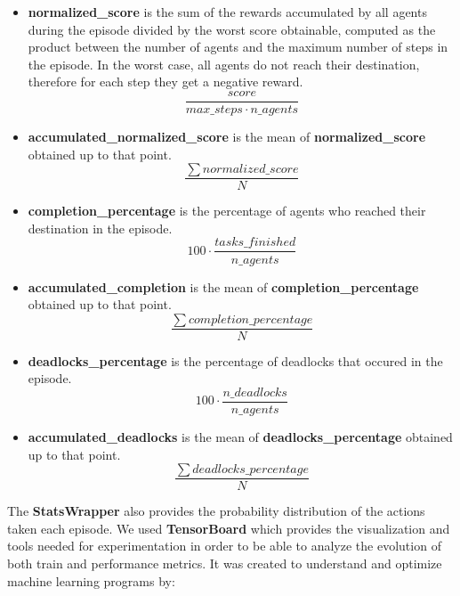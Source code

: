 \documentclass[11pt, a4paper, hidelinks]{report}
\begin{document}
\begin{itemize}
\item \textbf{normalized\_score} is the sum of the rewards accumulated by all agents during the episode divided by the worst score obtainable, computed as the product between the number of agents and the maximum number of steps in the episode.
In the worst case, all agents do not reach their destination, therefore for each step they get a negative reward.
\begin{equation}{\frac{score}{max\_steps \cdot n\_agents}}\label{eq:score}\end{equation}
\item \textbf{accumulated\_normalized\_score} is the mean of \textbf{normalized\_score} obtained up to that point.
\begin{equation}{\frac{\sum{normalized\_score}}{N}}\label{eq:score_acc}\end{equation}
\item \textbf{completion\_percentage} is the percentage of agents who reached their destination in the episode.
\begin{equation}{100 \cdot {\frac{tasks\_finished}{n\_agents}}}\label{eq:compl_perc}\end{equation}
\item \textbf{accumulated\_completion} is the mean of \textbf{completion\_percentage} obtained up to that point.
\begin{equation}{\frac{\sum{completion\_percentage}}{N}}\label{eq:compl_acc}\end{equation}
\item \textbf{deadlocks\_percentage} is the percentage of deadlocks that occured in the episode.
\begin{equation}{100 \cdot {\frac{n\_deadlocks}{n\_agents}}}\label{eq:deads_perc}\end{equation}
\item \textbf{accumulated\_deadlocks} is the mean of \textbf{deadlocks\_percentage} obtained up to that point.
\begin{equation}{\frac{\sum {deadlocks\_percentage}}{N}}\label{eq:deads_acc}\end{equation}
\end{itemize}

The \textbf{StatsWrapper} also provides the probability distribution of the actions taken each episode.
We used \textbf{TensorBoard} which provides the visualization and tools needed for experimentation in order to be able to analyze the evolution of both train and performance metrics.
It was created to understand and optimize machine learning programs by:
\end{document}
